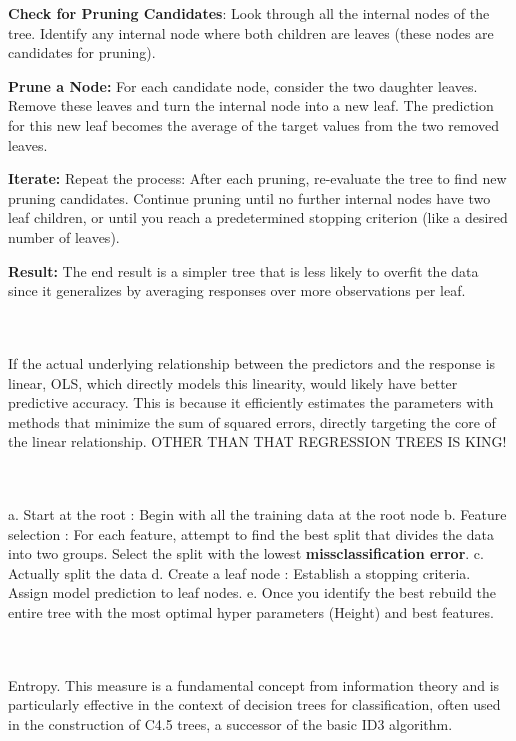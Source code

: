 \documentclass[12pt]{article}
\begin{document}
\begin{enumerate}
\textbf{Check for Pruning Candidates}: Look through all the internal nodes of the tree. Identify any internal node where both children are leaves (these nodes are candidates for pruning).

\textbf{Prune a Node:} For each candidate node, consider the two daughter leaves. Remove these leaves and turn the internal node into a new leaf.
The prediction for this new leaf becomes the average of the target values from the two removed leaves.

\textbf{Iterate:} Repeat the process: After each pruning, re-evaluate the tree to find new pruning candidates.
Continue pruning until no further internal nodes have two leaf children, or until you reach a predetermined stopping criterion (like a desired number of leaves).

\textbf{Result: }The end result is a simpler tree that is less likely to overfit the data since it generalizes by averaging responses over more observations per leaf.


 \\ \\ 
 If the actual underlying relationship between the predictors and the response is linear, OLS, which directly models this linearity, would likely have better predictive accuracy. This is because it efficiently estimates the parameters with methods that minimize the sum of squared errors, directly targeting the core of the linear relationship. OTHER THAN THAT REGRESSION TREES IS KING! 

 \\ \\ 

a. Start at the root : Begin with all the training data at the root node
b. Feature selection : For each feature, attempt to find the best split that divides the data into two groups. Select the split with the lowest \textbf{missclassification error}.
c. Actually split the data
d. Create a leaf node : Establish a stopping criteria. Assign model prediction to leaf nodes. 
e. Once you identify the best rebuild the entire tree with the most optimal hyper parameters (Height) and best features. 

 \\ \\ 
Entropy. This measure is a fundamental concept from information theory and is particularly effective in the context of decision trees for classification, often used in the construction of C4.5 trees, a successor of the basic ID3 algorithm. 


\end{enumerate}
\end{document}
